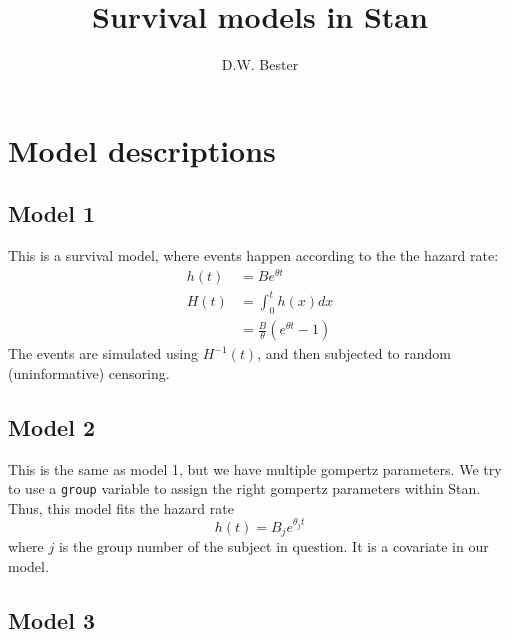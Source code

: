 \documentclass[12pt]{article}
\title{
Survival models in Stan
}
\author{D.W. Bester}
\date{}
\begin{document}
\maketitle

\section{Model descriptions}

\subsection*{Model 1}\label{subsec:model-1}

This is a survival model, where events happen according to the the
hazard rate:
\begin{align*}
h(t) 
&= B e^{\theta t} \\
H(t) 
&= \int_0^t{h(x)dx} \\
&= \frac{B}{\theta} \left( e^{\theta t}-1  \right)
\end{align*}
The events are simulated using $H^{-1}(t)$, and then subjected to
random (uninformative) censoring.


\subsection*{Model 2}\label{subsec:model-2}

This is the same as model 1, but we have multiple gompertz parameters.
We try to use a \texttt{group} variable to assign the right gompertz
parameters within Stan.
Thus, this model fits the hazard rate
\begin{equation}
h(t) = B_j e^{\theta_j t}
\end{equation}
where $j$ is the group number of the subject in question. It is a
covariate in our model.

\subsection*{Model 3}\label{subsec:model-3}
\end{document}
